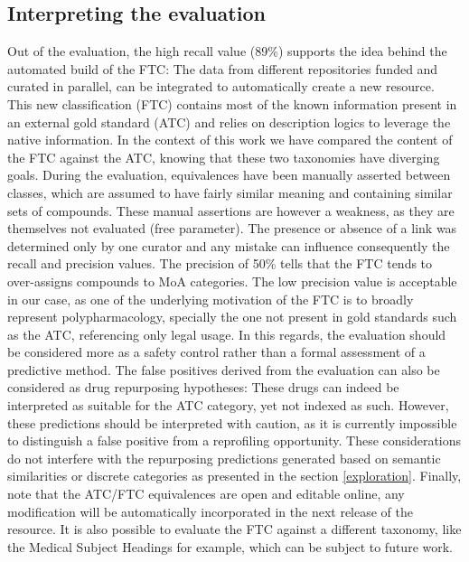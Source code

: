 \documentclass{bioinfo}
\begin{document}
\subsection{Interpreting the evaluation}\label{interpreting}
Out of the evaluation, the high recall value (89\%) supports the idea behind the automated build of the FTC: The data from different 
repositories funded and curated in parallel, can be integrated to automatically create a new resource. This new classification (FTC) 
contains most of the known information present in an external gold standard (ATC) and relies on description logics to 
leverage the native information. In the context of this work we have compared the content of 
the FTC against the ATC, knowing that these two 
taxonomies have diverging goals. During the evaluation, equivalences have been manually asserted between classes, 
which are assumed to have fairly similar meaning and containing similar sets of compounds.
These manual assertions 
are however a weakness, as they are themselves not evaluated (free parameter). The presence or absence of a link was 
determined only by one curator and any mistake can influence consequently the recall and precision values.
The precision of 50\% tells that the FTC tends to over-assigns compounds to MoA categories. The low precision value is acceptable 
in our case, as one of the underlying motivation of the FTC is to broadly represent polypharmacology, specially the one not present in
gold standards such as the ATC, referencing only legal usage.
In this regards, 
the evaluation should be considered more as a safety control rather than a formal assessment of a predictive method.
The false positives derived from the evaluation can also be considered as drug repurposing hypotheses: These drugs 
can indeed be interpreted as suitable for the ATC category, yet not indexed as such. However, these predictions 
should be interpreted with caution, as it is currently impossible to distinguish a false positive from a 
reprofiling opportunity. These considerations do not interfere with the repurposing predictions generated 
based on semantic similarities or discrete categories as presented in the section \ref{exploration}. Finally, 
note that the ATC/FTC equivalences are open and editable online, any modification will be automatically 
incorporated in the next release of the resource. It is also possible to evaluate the FTC against a different 
taxonomy, like the Medical Subject Headings for example, which can be subject to future work.
\end{document}
